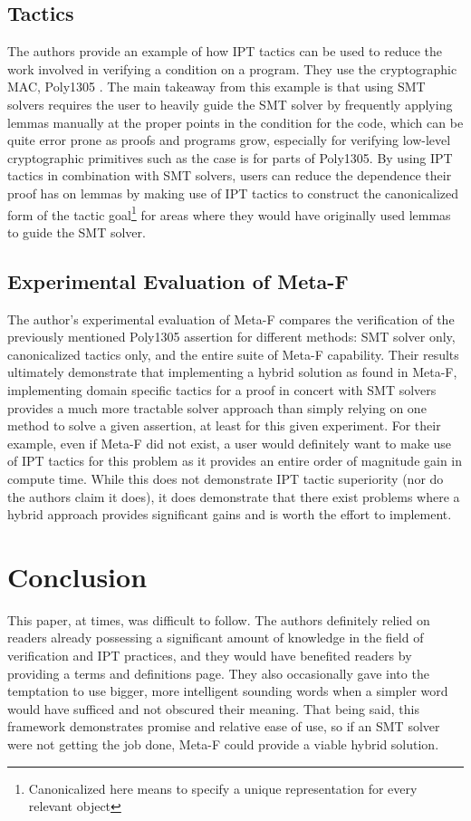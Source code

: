 \documentclass[10pt, journal]{IEEEtran}
\begin{document}
\subsection{Tactics}
The authors provide an example of how IPT tactics can be used to reduce the work involved in verifying a condition on a program. They use the cryptographic MAC, Poly1305 \cite{Bernstein2005}. The main takeaway from this example is that using SMT solvers requires the user to heavily guide the SMT solver by frequently applying lemmas manually at the proper points in the condition for the code, which can be quite error prone as proofs and programs grow, especially for verifying low-level cryptographic primitives such as the case is for parts of Poly1305. By using IPT tactics in combination with SMT solvers, users can reduce the dependence their proof has on lemmas by making use of IPT tactics to construct the canonicalized form of the tactic goal\footnote{Canonicalized here means to specify a unique representation for every relevant object} for areas where they would have originally used lemmas to guide the SMT solver.

\subsection{Experimental Evaluation of Meta-F\text{*}}
The author's experimental evaluation of Meta-F\text{*} compares the verification of the previously mentioned Poly1305 assertion for different methods: SMT solver only, canonicalized tactics only, and the entire suite of Meta-F\text{*} capability. Their results ultimately demonstrate that implementing a hybrid solution as found in Meta-F\text{*}, implementing domain specific tactics for a proof in concert with SMT solvers provides a much more tractable solver approach than simply relying on one method to solve a given assertion, at least for this given experiment. For their example, even if Meta-F\text{*} did not exist, a user would definitely want to make use of IPT tactics for this problem as it provides an entire order of magnitude gain in compute time. While this does not demonstrate IPT tactic superiority (nor do the authors claim it does), it does demonstrate that there exist problems where a hybrid approach provides significant gains and is worth the effort to implement.

\section{Conclusion}
This paper, at times, was difficult to follow. The authors definitely relied on readers already possessing a significant amount of knowledge in the field of verification and IPT practices, and they would have benefited readers by providing a terms and definitions page. They also occasionally gave into the temptation to use bigger, more intelligent sounding words when a simpler word would have sufficed and not obscured their meaning. That being said, this framework demonstrates promise and relative ease of use, so if an SMT solver were not getting the job done, Meta-F\text{*} could provide a viable hybrid solution.


\end{document}
